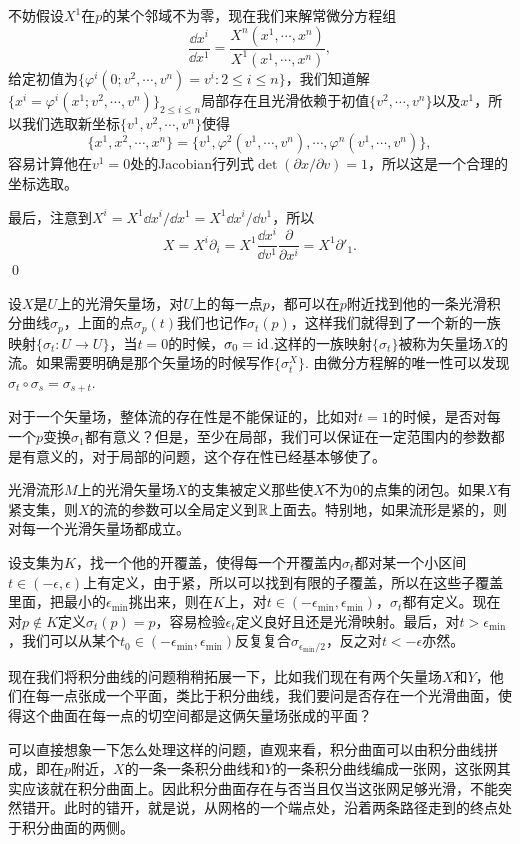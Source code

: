 	不妨假设$X^1$在$p$的某个邻域不为零，现在我们来解常微分方程组
	\[
		\frac{\dd x^i}{\dd x^1}=\frac{X^n(x^1,\cdots,x^n)}{X^1(x^1,\cdots,x^n)},
	\]
	给定初值为$\{\varphi^i(0;v^2,\cdots,v^n)=v^i:2\leq i \leq n\}$，我们知道解$\{x^i=\varphi^i(x^1;v^2,\cdots,v^n)\}_{2\leq i \leq n}$局部存在且光滑依赖于初值$\{v^2,\cdots,v^n\}$以及$x^1$，所以我们选取新坐标$\{v^1,v^2,\cdots,v^n\}$使得
	\[
		\{x^1,x^2,\cdots,x^n\}=\{v^1,\varphi^2(v^1,\cdots,v^n),\cdots,\varphi^n(v^1,\cdots,v^n)\},
	\]
	容易计算他在$v^1=0$处的Jacobian行列式$\det(\partial x/\partial v)=1$，所以这是一个合理的坐标选取。

	最后，注意到$X^i=X^1 \dd x^i/\dd x^1=X^1 \dd x^i/\dd v^1$，所以
	\[
		X=X^i\partial_i=X^1 \frac{\dd x^i}{\dd v^1}\frac{\partial}{\partial x^i}=X^1\partial'_1.
	\]\qed

设$X$是$U$上的光滑矢量场，对$U$上的每一点$p$，都可以在$p$附近找到他的一条光滑积分曲线$\sigma_p$，上面的点$\sigma_p(t)$我们也记作$\sigma_t(p)$，这样我们就得到了一个新的一族映射$\{\sigma_t:U\to U\}$，当$t=0$的时候，$\sigma_0=\operatorname{id}$.这样的一族映射$\{\sigma_t\}$被称为矢量场$X$的流。如果需要明确是那个矢量场的时候写作$\{\sigma^X_t\}$. 由微分方程解的唯一性可以发现$\sigma_t\circ \sigma_s=\sigma_{s+t}$.

对于一个矢量场，整体流的存在性是不能保证的，比如对$t=1$的时候，是否对每一个$p$变换$\sigma_1$都有意义？但是，至少在局部，我们可以保证在一定范围内的参数都是有意义的，对于局部的问题，这个存在性已经基本够使了。

\para 光滑流形$M$上的光滑矢量场$X$的支集被定义那些使$X$不为$0$的点集的闭包。如果$X$有紧支集，则$X$的流的参数可以全局定义到$\mathbb{R}$上面去。特别地，如果流形是紧的，则对每一个光滑矢量场都成立。

设支集为$K$，找一个他的开覆盖，使得每一个开覆盖内$\sigma_t$都对某一个小区间$t\in (-\epsilon,\epsilon)$上有定义，由于紧，所以可以找到有限的子覆盖，所以在这些子覆盖里面，把最小的$\epsilon_{\text{min}}$挑出来，则在$K$上，对$t\in(-\epsilon_{\text{min}},\epsilon_{\text{min}})$，$\sigma_t$都有定义。现在对$p\notin K$定义$\sigma_t(p)=p$，容易检验$\epsilon_t$定义良好且还是光滑映射。最后，对$t>\epsilon_{\text{min}}$，我们可以从某个$t_0\in (-\epsilon_{\text{min}},\epsilon_{\text{min}})$反复复合$\sigma_{\epsilon_{\text{min}}/2}$，反之对$t<-\epsilon$亦然。

\para 现在我们将积分曲线的问题稍稍拓展一下，比如我们现在有两个矢量场$X$和$Y$，他们在每一点张成一个平面，类比于积分曲线，我们要问是否存在一个光滑曲面，使得这个曲面在每一点的切空间都是这俩矢量场张成的平面？

可以直接想象一下怎么处理这样的问题，直观来看，积分曲面可以由积分曲线拼成，即在$p$附近，$X$的一条一条积分曲线和$Y$的一条积分曲线编成一张网，这张网其实应该就在积分曲面上。因此积分曲面存在与否当且仅当这张网足够光滑，不能突然错开。此时的错开，就是说，从网格的一个端点处，沿着两条路径走到的终点处于积分曲面的两侧。

